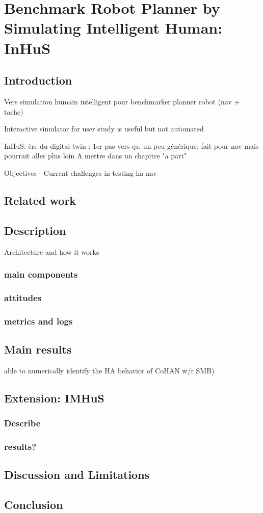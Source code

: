 \ifdefined{}
\else
\setcounter{chapter}{5} %
\dominitoc
\faketableofcontents
\fi

\chapter{Benchmark Robot Planner by Simulating Intelligent Human: InHuS}
\label{chap:6}
\minitoc

\section{Introduction}
Vers simulation humain intelligent pour benchmarker planner robot (nav + tache)

Interactive simulator for user study is useful but not automated

InHuS:
ère du digital twin : 1er pas vers ça, un peu générique, fait pour nav mais pourrait aller plus loin
A mettre dans un chapitre "a part"

Objectives - Current challenges in testing ha nav

\section{Related work}


\section{Description}
Architecture and how it works

\subsection{main components}
\subsection{attitudes}
\subsection{metrics and logs}

\section{Main results}
able to numerically identify the HA behavior of CoHAN w/r SMB)


\section{Extension: IMHuS}

\subsection{Describe}
\subsection{results?}

\section{Discussion and Limitations}
\section{Conclusion}